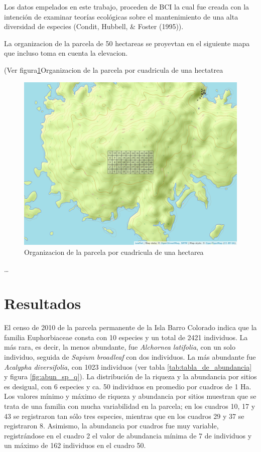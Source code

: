 \documentclass[11pt,]{article}
\begin{document}
Los datos empelados en este trabajo, proceden de BCI la cual fue creada
con la intención de examinar teorías ecológicas sobre el mantenimiento
de una alta diversidad de especies (Condit, Hubbell, \& Foster (1995)).

La organizacion de la parcela de 50 hectareas se proyevtan en el
siguiente mapa que incluso toma en cuenta la elevacion.

(Ver figura\ref{fig:mapa_cuadros}Organizacion de la parcela por
cuadricula de una hectatrea

\begin{figure}
\centering
\includegraphics{mapa_cuadros.png}
\caption{\label{fig:mapa_cuadros}Organizacion de la parcela por
cuadricula de una hectarea}
\end{figure}

\ldots

\section{Resultados}\label{resultados}

El censo de 2010 de la parcela permanente de la Isla Barro Colorado
indica que la familia Euphorbiaceae consta con 10 especies y un total de
2421 individuos. La más rara, es decir, la menos abundante, fue
\emph{Alchornea latifolia}, con un solo individuo, seguida de
\emph{Sapium broadleaf} con dos individuos. La más abundante fue
\emph{Acalypha diversifolia}, con 1023 individuos (ver tabla
\ref{tab:tabla_de_abundancia} y figura \ref{fig:abun_sp_q}). La
distribución de la riqueza y la abundancia por sitios es desigual, con 6
especies y ca. 50 individuos en promedio por cuadros de 1 Ha. Los
valores mínimo y máximo de riqueza y abundancia por sitios muestran que
se trata de una familia con mucha variabilidad en la parcela; en los
cuadros 10, 17 y 43 se registraron tan sólo tres especies, mientras que
en los cuadros 29 y 37 se registraron 8. Asimismo, la abundancia por
cuadros fue muy variable, registrándose en el cuadro 2 el valor de
abundancia mínima de 7 de individuos y un máximo de 162 individuos en el
cuadro 50.
\end{document}
